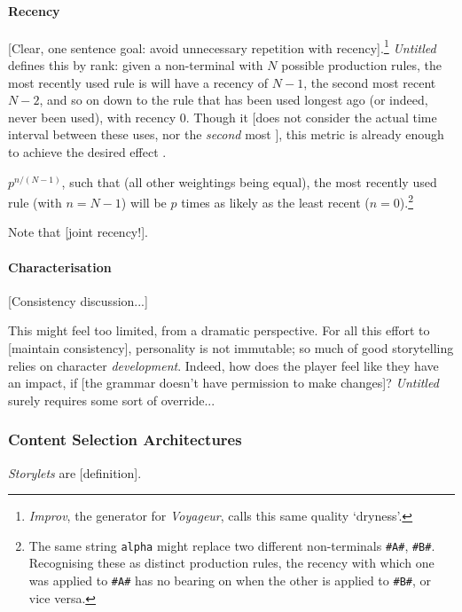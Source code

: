 \documentclass[a4paper, 11pt]{article}
\begin{document}
\begin{flushleft}
\paragraph{Recency} [Clear, one sentence goal: avoid unnecessary repetition with recency].\footnote{\textit{Improv}, the generator for \textit{Voyageur}, calls this same quality `dryness'.} \textit{Untitled} defines this by rank: given a non-terminal with $N$ possible production rules, the most recently used rule is will have a recency of $N-1$, the second most recent $N-2$, and so on down to the rule that has been used longest ago (or indeed, never been used), with recency $0$. Though it [does not consider the actual time interval between these uses, nor the \textit{second} most ], this metric is already enough to achieve the desired effect \citep{kazemiSimpleProceduralGeneration}.

\vspace{5pt} $p^{n/(N-1)}$, such that (all other weightings being equal), the most recently used rule (with $n = N-1$) will be $p$ times as likely as the least recent ($n = 0$).\footnote{The same string \texttt{alpha} might replace two different non-terminals \texttt{\#A\#}, \texttt{\#B\#}. Recognising these as distinct production rules, the recency with which one was applied to \texttt{\#A\#} has no bearing on when the other is applied to \texttt{\#B\#}, or vice versa.} 

\vspace{5pt}\noindent
Note that [joint recency!].

\paragraph{Characterisation} [Consistency discussion...]

\vspace{5pt}\noindent
This might feel too limited, from a dramatic perspective. For all this effort to [maintain consistency], personality is not immutable; so much of good storytelling relies on character \textit{development}.
Indeed, how does the player feel like they have an impact, if [the grammar doesn't have permission to make changes]? \textit{Untitled} surely requires some sort of override...

\subsubsection{Content Selection Architectures} \textit{Storylets} \citep{kreminskiStorylets} are [definition].


\end{flushleft}
\end{document}
